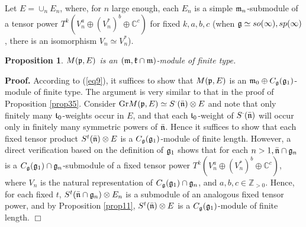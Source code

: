 \documentclass[12pt]{article}
\newcounter{theorem}
\newtheorem{prop}[theo]{Proposition}
\newenvironment{proof}{ \textbf{Proof.}}{$\Box$}
\newcommand {\ZZ} {\mathbb {Z}}
\newcommand {\CC} {\mathbb {C}}
\newcommand{\refprop}[1]{Proposition \ref{#1}}
\newcommand{\refeq}[1]{(\ref{#1})}
\newcommand{\Gr}{\mathrm{Gr}}
\begin{document}
Let $E = \cup_n E_n$, where, for $n$ large enough, each $E_n$ is a simple $\frak m_n$-submodule of a tensor power $T^k (V^a_n\oplus (V^*_n)^b\oplus\CC^c)$ for fixed $k,a,b,c$ (when $\frak g\simeq so(\infty), sp(\infty)$, there is an isomorphism $V_n\simeq V^*_n$).

\begin{prop} \label{prop42} $M(\frak p, E)$ is an $(\frak m,\frak
k\cap\frak m)$-module of finite type.
\end{prop}

\begin{proof} According to \refeq{eq9}, it suffices to show that $M(\frak p,E)$ is an $\frak m_0\oplus C_{\frak g}(\frak g_1)$-module of finite type.  The argument is very similar to that in the proof of \refprop{prop35}. Consider $\Gr M(\frak p,E)\simeq S^\cdot (\bar{\frak n})\otimes E$ and note that only finitely many $\frak t_0$-weights occur in $E$, and that each $\frak t_0$-weight of $S^\cdot(\bar{\frak n})$ will occur only in finitely many symmetric powers of $\bar{\frak n}$.  Hence it suffices to show that each fixed tensor product $S^t(\bar{\frak n})\otimes E$ is a $C_{\frak g}(\frak g_1)$-module of finite length.  However, a direct verification based on the definition of $\frak g_1$ shows that for each $n > 1, \bar{\frak n}\cap\frak g_n$ is a $C_{\frak g}(\frak g_1)\cap\frak g_n$-submodule of a fixed tensor power $T^{k}(V^{a}_n\oplus (V^*_n)^{b}\oplus \CC^{c})$, where $V_n$ is the natural representation of  $C_{\frak g}(\frak g_1)\cap\frak g_n$, and $a, b, c\in\ZZ_{> 0}$. Hence, for each fixed $t$, $S^t(\bar{\frak n}\cap\frak g_n)\otimes E_n$ is a submodule of an analogous fixed tensor power, and by \refprop{prop11}, $S^t(\bar{\frak n})\otimes E$ is a $C_{\frak g}(\frak g_1)$-module of finite length.
\end{proof}

\end{document}
